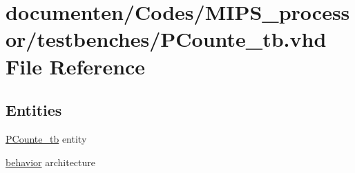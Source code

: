 \hypertarget{_p_counte__tb_8vhd}{\section{documenten/\-Codes/\-M\-I\-P\-S\-\_\-processor/testbenches/\-P\-Counte\-\_\-tb.vhd File Reference}
\label{_p_counte__tb_8vhd}
}
\subsection*{Entities}
\begin{DoxyCompactItemize}
\item 
\hyperlink{class_p_counte__tb}{P\-Counte\-\_\-tb} entity
\item 
\hyperlink{class_p_counte__tb_1_1behavior}{behavior} architecture
\end{DoxyCompactItemize}
